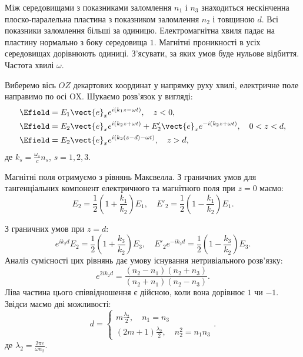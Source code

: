 \begin{problem}
Між середовищами з показниками заломлення $n_1$  і $n_3$ знаходиться нескінченна плоско-паралельна
пластина з показником заломлення $n_2$  і товщиною $d$. Всі показники заломлення більші за
одиницю. Електромагнітна хвиля падає на пластину нормально з боку середовища $1$. Магнітні
проникності в усіх середовищах дорівнюють одиниці. З'ясувати, за яких умов буде нульове відбиття.
Частота хвилі $\omega$.
\begin{solution}
	Виберемо вісь $OZ$ декартових координат у напрямку руху хвилі, електричне поле направимо по осі
	OX. Шукаємо розв’язок у вигляді:
	\begin{align*}
		\Efield & = E_1\vect{e}_x e^{i(k_1z - \omega t)}, \quad z<0,                               \\
		\Efield & = E_2\vect{e}_x e^{i(k_2z + \omega t)} + E'_2\vect{e}_x e^{-i(k_2z + \omega t)},
		\quad 0<z<d,                                                                               \\
		\Efield & = E_2\vect{e}_x e^{i(k_2(z-d) - \omega t)}, \quad z>d,
	\end{align*}
	де $k_s = \frac{\omega_s}{c}n_s$, $s = 1,2,3$.

	Магнітні поля отримуємо з рівнянь Максвелла. З граничних умов для тангенціальних компонент
	електричного та магнітного поля при $z = 0$ маємо:
	\[
		E_2 = \frac{1}{2}\left(1 + \frac{k_1}{k_2} \right){E_1}, \quad E'_2 = \frac{1}{2}\left( 1 -
		\frac{k_1}{k_2} \right){E_1}.
	\]

	З граничних умов при  $z = d$:
	\[
		e^{ik_2d}{E_2} = \frac{1}{2}\left( 1 + \frac{k_3}{k_2} \right)E_3, \quad E'_2e^{- ik_2d} =
		\frac{1}{2}\left( 1 - \frac{k_3}{k_2} \right)E_3.
	\]
	Аналіз сумісності цих рівнянь дає умову існування нетривіального розв’язку:
	\[
		e^{2ik_2d} = \frac{(n_2 - n_1)(n_2 + n_3)}{(n_2 + n_1)(n_2 - n_3)}.
	\]
	Ліва частина цього співвідношення є дійсною, коли вона дорівнює $1$ чи $-1$. Звідси маємо дві
	можливості:
	\begin{equation*}
		d=
		\begin{cases}
			m\frac{\lambda_2}{2}, \quad n_1 = n_3 \\
			(2m+1)\frac{\lambda_2}{2}, \quad n_2^2 = n_1n_3
		\end{cases}.
	\end{equation*}
	де $\lambda_2 = \frac{2\pi c}{\omega n_2}$.
\end{solution}
\end{problem}

